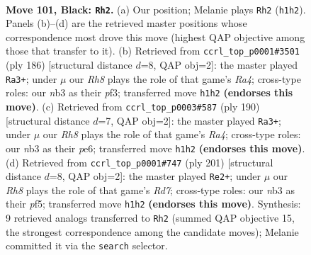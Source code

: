 \documentclass[11pt]{article}
\begin{document}
\clearpage

\begin{figure}[p]\centering
\begin{subfigure}{0.46\textwidth}\centering
\resizebox{\linewidth}{!}{%
\newchessgame
\chessboard[
  setfen={8/8/8/3k4/5K2/1N6/2R3P1/7r b - - 67 101},
  showmover=false,
  pgfstyle=straightmove, color=movearrow, markmove={h1-h2}
]}
\caption{}
\end{subfigure}\hfill
\begin{subfigure}{0.46\textwidth}\centering
\resizebox{\linewidth}{!}{%
\newchessgame
\chessboard[
  setfen={8/7r/8/8/R7/3k1p1p/7K/8 w - - 6 94},
  showmover=false,
  pgfstyle=straightmove, color=movearrow, markmove={a4-a3}
]}
\caption{}
\end{subfigure}
\\[4pt]
\begin{subfigure}{0.46\textwidth}\centering
\resizebox{\linewidth}{!}{%
\newchessgame
\chessboard[
  setfen={6r1/8/4p3/8/R7/4k1p1/6K1/8 w - - 80 96},
  showmover=false,
  pgfstyle=straightmove, color=movearrow, markmove={a4-a3}
]}
\caption{}
\end{subfigure}\hfill
\begin{subfigure}{0.46\textwidth}\centering
\resizebox{\linewidth}{!}{%
\newchessgame
\chessboard[
  setfen={8/4K2k/7P/5P2/8/7R/3r4/8 b - - 54 101},
  showmover=false,
  pgfstyle=straightmove, color=movearrow, markmove={d2-e2}
]}
\caption{}
\end{subfigure}
\caption{\textbf{Move 101, Black: \texttt{Rh2}.} (a) Our position; Melanie plays \texttt{Rh2} (\texttt{h1h2}). Panels (b)--(d) are the retrieved master positions whose correspondence most drove this move (highest QAP objective among those that transfer to it). (b) Retrieved from \texttt{ccrl\_top\_p0001\#3501} (ply 186) [structural distance $d$=8, QAP obj=2]: the master played \texttt{Ra3+}; under $\mu$ our \emph{Rh8} plays the role of that game's \emph{Ra4}; cross-type roles: our \emph{n}b3 as their \emph{p}f3; transferred move \texttt{h1h2} \textbf{(endorses this move)}. (c) Retrieved from \texttt{ccrl\_top\_p0003\#587} (ply 190) [structural distance $d$=7, QAP obj=2]: the master played \texttt{Ra3+}; under $\mu$ our \emph{Rh8} plays the role of that game's \emph{Ra4}; cross-type roles: our \emph{n}b3 as their \emph{p}e6; transferred move \texttt{h1h2} \textbf{(endorses this move)}. (d) Retrieved from \texttt{ccrl\_top\_p0001\#747} (ply 201) [structural distance $d$=8, QAP obj=2]: the master played \texttt{Re2+}; under $\mu$ our \emph{Rh8} plays the role of that game's \emph{Rd7}; cross-type roles: our \emph{n}b3 as their \emph{p}f5; transferred move \texttt{h1h2} \textbf{(endorses this move)}. Synthesis: 9 retrieved analogs transferred to \texttt{Rh2} (summed QAP objective 15, the strongest correspondence among the candidate moves); Melanie committed it via the \texttt{search} selector.}
\label{fig:thought-m201}
\end{figure}
\end{document}
